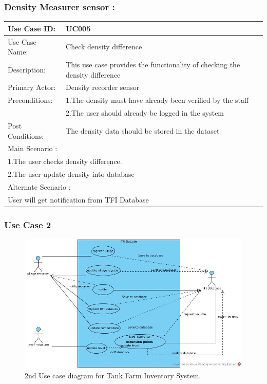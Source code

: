		\subsubsection{Density Measurer sensor :}
		\begin{center}
			\vspace*{1\baselineskip}	
			\begin{tabular}{|l|p{10cm}|}
				\hline
				Use Case ID: & UC005 \\
				\hline
				Use Case Name: & Check density difference \\
				\hline
				Description: & This use case provides the functionality of checking the density difference \\
				\hline
				Primary Actor: & Density recorder sensor \\
				\hline
				Preconditions: & 1.The density must have already been verified by the staff\\ 
				& 2.The user should already be logged in the system \\
				\hline
				Post Conditions: & The density data should be stored in the dataset\\
				\hline
				\multicolumn{2}{|l|}{Main Scenario :} \\
				\hline
				\multicolumn{2}{|l|}{1.The user checks density difference.} \\
				\multicolumn{2}{|l|}{2.The user update density into database} \\
				\hline
				\multicolumn{2}{|l|}{Alternate Scenario :} \\
				\hline
				\multicolumn{2}{|l|}{User will get notification from TFI Database} \\
				\hline
			\end{tabular}
		\end{center}
				
				
		
\clearpage
\subsubsection{Use Case 2}
\vspace*{1\baselineskip}
\begin{figure}[htbp]
	\begin{center}
		\includegraphics[width=\linewidth]{./images/UC003.jpeg}
		\caption{2nd Use case diagram for Tank Farm Inventory System.}
		\label{fig:UC003.jpeg}
	\end{center}
\end{figure}

